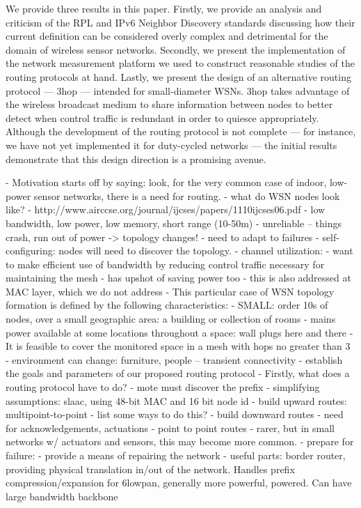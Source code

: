 We provide three results in this paper.
Firstly, we provide an analysis and criticism of the RPL and IPv6 Neighbor Discovery standards discussing how their current definition can be considered overly complex and detrimental for the domain of wireless sensor networks.
Secondly, we present the implementation of the network measurement platform we used to construct reasonable studies of the routing protocols at hand.
Lastly, we present the design of an alternative routing protocol --- 3hop --- intended for small-diameter WSNs.
3hop takes advantage of the wireless broadcast medium to share information between nodes to better detect when control traffic is redundant in order to quiesce appropriately.
Although the development of the routing protocol is not complete --- for instance, we have not yet implemented it for duty-cycled networks --- the initial results demonstrate that this design direction is a promising avenue.

- Motivation starts off by saying: look, for the very common case of indoor, low-power
  sensor networks, there is a need for routing.
- what do WSN nodes look like?
    - http://www.airccse.org/journal/ijcses/papers/1110ijcses06.pdf
    - low bandwidth, low power, low memory, short range (10-50m)
    - unreliable -- things crash, run out of power -> topology changes!
      - need to adapt to failures
    - self-configuring: nodes will need to discover the topology.
    - channel utilization:
      - want to make efficient use of bandwidth by reducing control traffic
        necessary for maintaining the mesh
      - has upshot of saving power too
      - this is also addressed at MAC layer, which we do not address
- This particular case of WSN topology formation is defined by the following characteristics:
    - SMALL: order 10s of nodes, over a small geographic area: a building or collection of rooms
    - mains power available at some locations throughout a space: wall plugs here and there
    - It is feasible to cover the monitored space in a mesh with hops no greater than 3
    - environment can change: furniture, people -- transient connectivity
- establish the goals and parameters of our proposed routing protocol
- Firstly, what does a routing protocol have to do?
    - mote must discover the prefix
      - simplifying assumptions: slaac, using 48-bit MAC and 16 bit node id
    - build upward routes: multipoint-to-point
      - list some ways to do this?
    - build downward routes
      - need for acknowledgements, actuations
    - point to point routes
      - rarer, but in small networks w/ actuators and sensors, this may become more common.
    - prepare for failure:
      - provide a means of repairing the network
    - useful parts: border router, providing physical translation in/out of
      the network. Handles prefix compression/expansion for 6lowpan, generally
      more powerful, powered. Can have large bandwidth backbone
\fi

